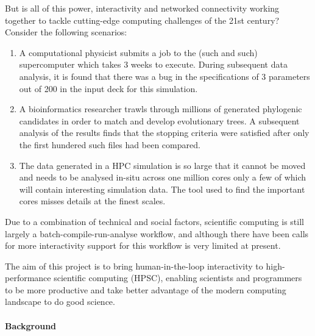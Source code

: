 \documentclass[a4paper]{scrartcl}
\begin{document}
But is all of this power, interactivity and networked connectivity
working together to tackle cutting-edge computing challenges of the
21st century? Consider the following scenarios:
\begin{enumerate}
\item A computational physicist submits a job to the (such and
  such) supercomputer which takes 3 weeks to execute. During
  subsequent data analysis, it is found that there was a bug in the
  specifications of 3 parameters out of 200 in the input deck for this
  simulation.

\item A bioinformatics researcher trawls through millions of generated
  phylogenic candidates in order to match and develop evolutionary
  trees. A subsequent analysis of the results finds that the stopping
  criteria were satisfied after only the first hundered such files had
  been compared.

\item The data generated in a HPC simulation is so large that it
  cannot be moved and needs to be analysed in-situ across one million
  cores only a few of which will contain interesting simulation data.
  The tool used to find the important cores misses details at the
  finest scales.
\end{enumerate}

Due to a combination of technical and social factors, scientific
computing is still largely a batch-compile-run-analyse workflow, and
although there have been calls for more
interactivity\parencite{Gil2007} support for this workflow is very
limited at present\parencite{Mattoso}.

The aim of this project is to bring human-in-the-loop interactivity to
high-performance scientific computing (HPSC), enabling scientists and
programmers to be more productive and take better advantage of the
modern computing landscape to do good science.

\paragraph{Background}
\end{document}
